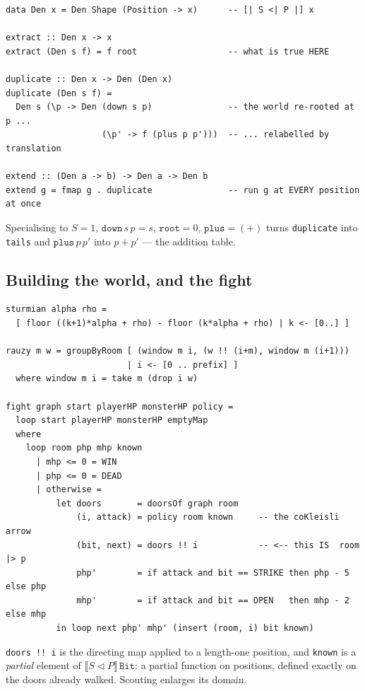 \documentclass[11pt,a4paper]{article}
\theoremstyle{definition}
\theoremstyle{plain}
\theoremstyle{remark}
\newcommand{\dc}{\ensuremath{S \triangleleft P}}
\newcommand{\den}[1]{\ensuremath{\llbracket #1 \rrbracket}}
\begin{document}
\begin{lstlisting}
data Den x = Den Shape (Position -> x)      -- [| S <| P |] x

extract :: Den x -> x
extract (Den s f) = f root                  -- what is true HERE

duplicate :: Den x -> Den (Den x)
duplicate (Den s f) =
  Den s (\p -> Den (down s p)               -- the world re-rooted at p ...
                   (\p' -> f (plus p p')))  -- ... relabelled by translation

extend :: (Den a -> b) -> Den a -> Den b
extend g = fmap g . duplicate               -- run g at EVERY position at once
\end{lstlisting}

\noindent
Specialising to $S = 1$, $\texttt{down}\,s\,p = s$, $\texttt{root} = 0$,
$\texttt{plus} = (+)$ turns \texttt{duplicate} into \texttt{tails} and
$\texttt{plus}\,p\,p'$ into $p + p'$ --- the addition table.

\subsection{Building the world, and the fight}

\begin{lstlisting}
sturmian alpha rho =
  [ floor ((k+1)*alpha + rho) - floor (k*alpha + rho) | k <- [0..] ]

rauzy m w = groupByRoom [ (window m i, (w !! (i+m), window m (i+1)))
                        | i <- [0 .. prefix] ]
  where window m i = take m (drop i w)

fight graph start playerHP monsterHP policy =
  loop start playerHP monsterHP emptyMap
  where
    loop room php mhp known
      | mhp <= 0 = WIN
      | php <= 0 = DEAD
      | otherwise =
          let doors       = doorsOf graph room
              (i, attack) = policy room known     -- the coKleisli arrow
              (bit, next) = doors !! i            -- <-- this IS  room |> p
              php'        = if attack and bit == STRIKE then php - 5 else php
              mhp'        = if attack and bit == OPEN   then mhp - 2 else mhp
          in loop next php' mhp' (insert (room, i) bit known)
\end{lstlisting}

\noindent
\texttt{doors !!\ i} is the directing map applied to a length-one position, and
\texttt{known} is a \emph{partial} element of $\den{\dc}\,\texttt{Bit}$: a
partial function on positions, defined exactly on the doors already walked.
Scouting enlarges its domain.
\end{document}
